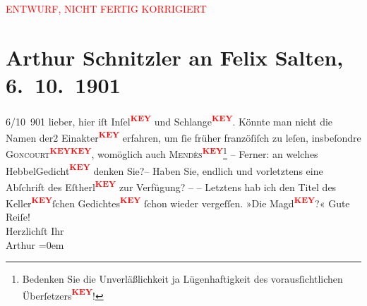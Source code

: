 
\begin{center}
            \textcolor{red}{ENTWURF, NICHT FERTIG KORRIGIERT}
                      \end{center}
            
         
         \renewcommand{\erwaehntePersonen}{Personen: Friedrich Hebbel, Catulle Mendès, Felix Salten}
         \renewcommand{\erwaehnteOrte}{Orte: Wien}
         \renewcommand{\erwaehnteWerke}{}
               \section[Arthur Schnitzler an Felix Salten, 6. 10. 1901]{ Arthur Schnitzler an Felix Salten, 6. 10. 1901}\nopagebreak{}\rehead{ }\begin{ledgroupsized}[t]{13cm}\normalsize\beginnumbering \toendnotes[C]{\smallbreak\pagebreak[2]} 
\toendnotes[C]{\smallbreak}\pstart
           \raggedleft{}{\pb}6/10 901\pend
           \pstart
           lieber, hier iſt Inſel\textcolor{red}{\textsuperscript{\textbf{KEY}}} und Schlange\textcolor{red}{\textsuperscript{\textbf{KEY}}}. \pend
           \pstart
           Könnte man nicht die Namen der2
                  Einakter\textcolor{red}{\textsuperscript{\textbf{KEY}}} erfahren, um ſie früher franzöſiſch zu leſen, insbeſondre \textsc{Goncourt\textcolor{red}{\textsuperscript{\textbf{KEY}}}\textcolor{red}{\textsuperscript{\textbf{KEY}}}}, womöglich auch \textsc{Mendès\textcolor{red}{\textsuperscript{\textbf{KEY}}}}\footnote{\noindent{}Bedenken Sie die Unverläßlichkeit ja Lügenhaftigkeit des vorausſichtlichen Überſetzers\textcolor{red}{\textsuperscript{\textbf{KEY}}}!} – Ferner: an welches HebbelGedicht\textcolor{red}{\textsuperscript{\textbf{KEY}}} denken Sie?– {\pb}Haben Sie, endlich und vorletztens
               eine Abſchrift des Eſtherl\textcolor{red}{\textsuperscript{\textbf{KEY}}} zur Verfügung? – \pend
           \pstart
           – Letztens hab ich den Titel des Keller\textcolor{red}{\textsuperscript{\textbf{KEY}}}ſchen Gedichtes\textcolor{red}{\textsuperscript{\textbf{KEY}}} ſchon wieder vergeſſen. »Die Magd\textcolor{red}{\textsuperscript{\textbf{KEY}}}?« \pend
           \pstart
           Gute Reiſe! {\\[\baselineskip]}Herzlichſt Ihr {\\[\baselineskip]}\spacefill\mbox{Arthur}\pend
           \leftskip=0em{}
         
         \endnumbering{}\end{ledgroupsized}\begin{anhang}\end{anhang}\newcommand{\dateiname}{L02971}\newcommand{\titel}{Arthur Schnitzler an Felix Salten, 6. 10. 1901}\newcommand{\editorInnen}{Martin Anton Müller und Laura Untner}
      